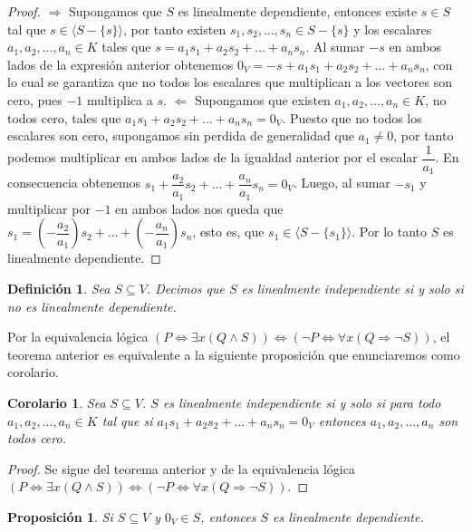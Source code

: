 \documentclass{book}
\newtheorem{proposition}{Proposición}
\newtheorem{definition}{Definición}
\newtheorem{corollary}{Corolario}
\begin{document}
\begin{proof}
$\Rightarrow$ Supongamos que $S$ es linealmente dependiente, entonces existe $s \in S$ tal que $s \in \langle S-\{ s \} \rangle$, por tanto existen $s_1,s_2,...,s_n \in S-\{s\}$ y los escalares $a_1,a_2,...,a_n \in K$ tales que $s=a_1s_1+a_2s_2+...+a_ns_n$. Al sumar $-s$ en ambos lados de la expresión anterior obtenemos $0_V=-s+a_1s_1+a_2s_2+...+a_ns_n$, con lo cual se garantiza que no todos los escalares que multiplican a los vectores son cero, pues $-1$ multiplica a $s$.\newline \newline
$\Leftarrow$ Supongamos que existen $a_1,a_2,...,a_n \in K$, no todos cero, tales que $a_1s_1+a_2s_2+...+a_ns_n=0_V$. Puesto que no todos los escalares son cero, supongamos sin perdida de generalidad que $a_1\neq 0$, por tanto podemos multiplicar en ambos lados de la igualdad anterior por el escalar $\dfrac{1}{a_1}$. En consecuencia obtenemos $s_1+\dfrac{a_2}{a_1}s_2+...+\dfrac{a_n}{a_1} s_n=0_V$. Luego, al sumar $-s_1$ y multiplicar por $-1$ en ambos lados nos queda que $s_1=\left(-\dfrac{a_2}{a_1}\right) s_2+...+\left( - \dfrac{a_n}{a_1}\right) s_n$, esto es, que $s_1 \in \langle S -\{ s_1 \} \rangle$. Por lo tanto $S$ es linealmente dependiente.
\end{proof}

\begin{definition}
Sea $S \subseteq V$. Decimos que $S$ es linealmente independiente si y solo si no es linealmente dependiente.
\end{definition}

Por la equivalencia lógica $(P \Leftrightarrow \exists x (Q \wedge S)) \Leftrightarrow (\neg P \Leftrightarrow \forall x (Q\Rightarrow \neg S))$, el teorema anterior es equivalente a la siguiente proposición que enunciaremos como corolario.

\begin{corollary}
Sea $S \subseteq V$. $S$ es linealmente independiente si y solo si para todo $a_1,a_2,...,a_n \in K$ tal que si $a_1s_1+a_2s_2+...+a_ns_n=0_V$ entonces $a_1,a_2,...,a_n$ son todos cero.
\end{corollary}

\begin{proof}
Se sigue del teorema anterior y de la equivalencia lógica $(P \Leftrightarrow \exists x (Q \wedge S)) \Leftrightarrow (\neg P \Leftrightarrow \forall x (Q\Rightarrow \neg S))$.
\end{proof}

\begin{proposition}
Si $S \subseteq V$ y $0_V \in S$, entonces $S$ es linealmente dependiente.
\end{proposition}
\end{document}
